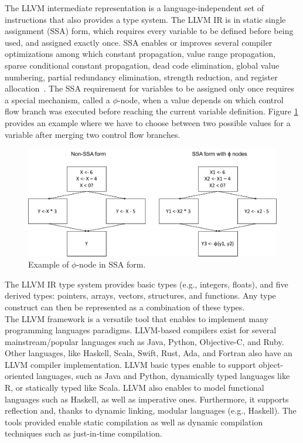 The LLVM intermediate representation is a language-independent set of instructions that also provides a type system.
The LLVM IR is in static single assignment (SSA) form, which requires every variable to be defined before being used, and assigned exactly once. 
SSA enables or improves several compiler optimizations among which constant propagation, value range propagation, sparse conditional constant propagation, dead code elimination, global value numbering, partial redundancy elimination, strength reduction, and register allocation~\cite{appel1998ssa}.
The SSA requirement for variables to be assigned only once requires a special mechanism, called a $\phi$-node, when a value depends on which control flow branch was executed before reaching the current variable definition.
Figure \ref{SSA example} provides an example where we have to choose between two possible values for a variable after merging two control flow branches.\\

\begin{figure}[h]
\centering
\includegraphics[scale=0.5]{Figures/SSAForm.pdf}
\decoRule
\caption[SSA example]{Example of $\phi$-node in SSA form.}
\label{SSA example}
\end{figure}

The LLVM IR type system provides basic types (e.g., integers, floats), and five derived types: pointers, arrays, vectors, structures, and functions.
Any type construct can then be represented as a combination of these types.\\

The LLVM framework is a versatile tool that enables to implement many programming languages paradigms.
LLVM-based compilers exist for several mainstream/popular languages such as Java, Python, Objective-C, and Ruby.
Other languages, like Haskell, Scala, Swift, Rust, Ada, and Fortran also have an LLVM compiler implementation.
LLVM basic types enable to support object-oriented languages, such as Java and Python, dynamically typed languages like R, or statically typed like Scala.
LLVM also enables to model functional languages such as Haskell, as well as imperative ones. 
Furthermore, it supports reflection and, thanks to dynamic linking, modular languages (e.g., Haskell).
The tools provided enable static compilation as well as dynamic compilation techniques such as just-in-time compilation.\\

